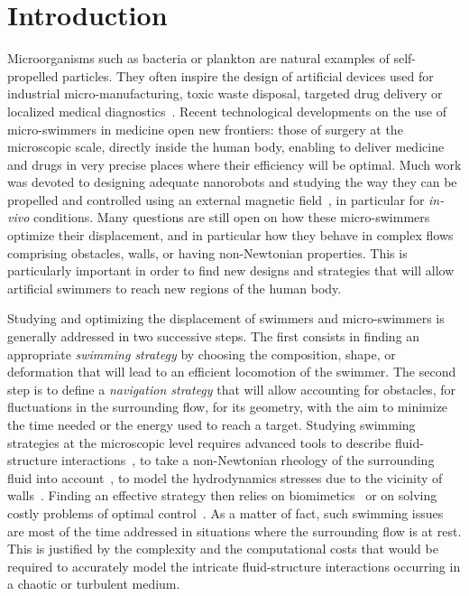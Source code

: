 \documentclass[aps,pre,reprint,superscriptaddress]{revtex4-2}
\begin{document}
\section{Introduction}
Microorganisms such as bacteria or plankton are natural examples of self-propelled particles. They often inspire the design of artificial devices used for industrial micro-manufacturing, toxic waste disposal, targeted drug delivery or localized medical diagnostics~\cite{wu2020medical}. Recent technological developments on the use of micro-swimmers in medicine open new frontiers: those of surgery at the microscopic scale, directly inside the human body, enabling to deliver medicine and drugs in very precise places where their efficiency will be optimal. Much work was devoted to designing adequate nanorobots and studying the way they can be propelled and controlled  using an external  magnetic field~\cite{Magneticswim}, in particular for \textit{in-vivo} conditions. Many questions are still open on how these micro-swimmers optimize their displacement, and in particular how they behave in complex flows comprising obstacles, walls, or having non-Newtonian properties. This is particularly important in order to find new designs and strategies that will allow artificial swimmers to reach new regions of the human body.

Studying and optimizing the displacement of swimmers and micro-swimmers is generally addressed in two successive steps. The first consists in finding an appropriate \textit{swimming strategy} by choosing the composition, shape, or deformation that will lead to an efficient locomotion of the swimmer. The second step is to define a \textit{navigation strategy} that will allow accounting for obstacles, for fluctuations in the surrounding flow, for its geometry, with the aim to minimize the time needed or the energy used to reach a target. Studying swimming strategies at the microscopic level requires advanced tools to describe fluid-structure interactions~\cite{berti2020swimming,alouges2013self}, to take a non-Newtonian rheology of the surrounding fluid into account~\cite{shen2011undulatory}, to model the hydrodynamics stresses due to the vicinity of walls~\cite{daddi2021hydrodynamics}. Finding an effective strategy then relies on biomimetics~\cite{borazjani2009numerical,cohen2010swimming} or on solving costly problems of optimal control~\cite{alouges2019energy}. As a matter of fact, such swimming issues are most of the time addressed in situations where the surrounding flow is at rest. This is justified by the complexity and the computational costs that would be required to accurately model the intricate fluid-structure interactions occurring in a chaotic or turbulent medium. 
\end{document}
